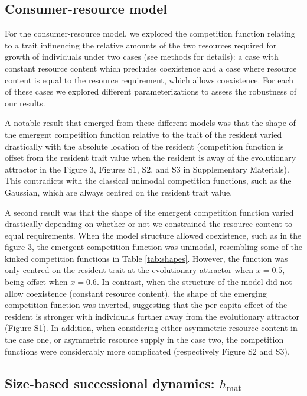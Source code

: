 \documentclass[a4paper,11pt]{article}
\newcommand{\hmat}{\ensuremath{h_{\text{mat}}}}
\begin{document}
\subsection{Consumer-resource model}

For the consumer-resource model, we explored the competition function relating to a trait influencing the relative amounts of the two resources required for growth of individuals under two cases (see methods for details): a case with constant resource content which precludes coexistence and a case where resource content is equal to the resource requirement, which allows coexistence. For each of these cases we explored different parameterizations to assess the robustness of our results.

A notable result that emerged from these different models was that the shape of the emergent competition function relative to the trait of the resident varied drastically with the absolute location of the resident (competition function is offset from the resident trait value when the resident is away of the evolutionary attractor in the Figure 3, Figures S1, S2, and S3 in Supplementary Materials). This contradicts with the classical unimodal competition functions, such as the Gaussian, which are always centred on the resident trait value. 

A second result was that the shape of the emergent competition function varied drastically depending on whether or not we constrained the resource content to equal requirements. When the model structure allowed coexistence, such as in the figure 3, the emergent competition function was unimodal, resembling some of the kinked competition functions in Table \ref{tab:shapes}. However, the function was only centred on the resident trait at the evolutionary attractor when $x = 0.5$, being offset when $x = 0.6$. In contrast, when the structure of the model did not allow coexistence (constant resource content), the shape of the emerging competition function was inverted, suggesting that the per capita effect of the resident is stronger with individuals further away from the evolutionary attractor (Figure S1). In addition, when considering either asymmetric resource content in the case one, or asymmetric resource supply in the case two, the competition functions were considerably more complicated (respectively Figure S2 and S3). 

\subsection{Size-based successional dynamics: \hmat}
\end{document}
